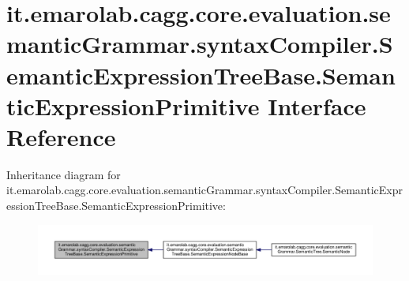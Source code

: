 \hypertarget{interfaceit_1_1emarolab_1_1cagg_1_1core_1_1evaluation_1_1semanticGrammar_1_1syntaxCompiler_1_1Se776f6389441f31f1bb3271e5a57601d8}{\section{it.\-emarolab.\-cagg.\-core.\-evaluation.\-semantic\-Grammar.\-syntax\-Compiler.\-Semantic\-Expression\-Tree\-Base.\-Semantic\-Expression\-Primitive Interface Reference}
\label{interfaceit_1_1emarolab_1_1cagg_1_1core_1_1evaluation_1_1semanticGrammar_1_1syntaxCompiler_1_1Se776f6389441f31f1bb3271e5a57601d8}
}


Inheritance diagram for it.\-emarolab.\-cagg.\-core.\-evaluation.\-semantic\-Grammar.\-syntax\-Compiler.\-Semantic\-Expression\-Tree\-Base.\-Semantic\-Expression\-Primitive\-:\nopagebreak
\begin{figure}[H]
\begin{center}
\leavevmode
\includegraphics[width=350pt]{interfaceit_1_1emarolab_1_1cagg_1_1core_1_1evaluation_1_1semanticGrammar_1_1syntaxCompiler_1_1Se88a317739d259d7be3df091b7b6f2f73}
\end{center}
\end{figure}

